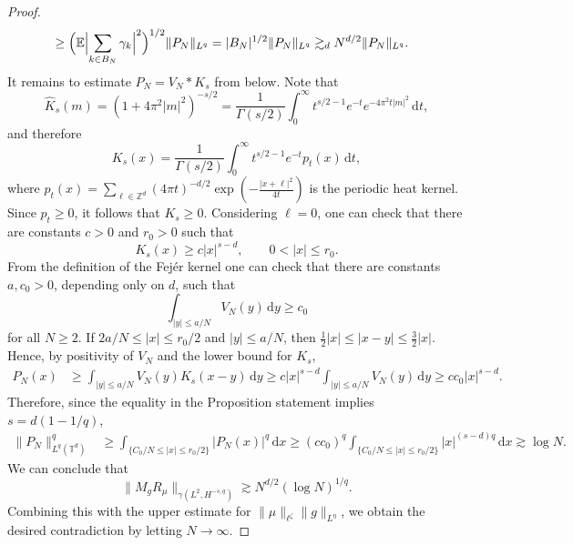 \documentclass[reqno]{amsart}
\theoremstyle{plain}
\theoremstyle{remark}
\theoremstyle{plain}
\numberwithin{equation}{section}
\newcommand{\di}{\mathrm{d}}
\newcommand{\1}{\one}
\begin{document}
\begin{proof}
\[\begin{aligned}
        &\geq
        \Bigl(\mathbb E\Bigl|\sum_{k\in B_N}\gamma_k\Bigr|^2\Bigr)^{1/2}
        \|P_N\|_{L^q}                                                       
        =
        |B_N|^{1/2}\|P_N\|_{L^q}
        \gtrsim_d
        N^{d/2}\|P_N\|_{L^q}.
\end{aligned}
\]
It remains to estimate $P_N=V_N*K_s$ from below. %
Note that
\[
        \widehat K_s(m) = (1+4\pi^2|m|^2)^{-s/2}
        =
        \frac1{\Gamma(s/2)}
        \int_0^\infty t^{s/2-1}e^{-t}e^{-4\pi^2t|m|^2}\,\di t,
\]
and therefore
\[
        K_s(x)
        =
        \frac1{\Gamma(s/2)}
        \int_0^\infty t^{s/2-1}e^{-t}p_t(x)\,\di t,
\]
where $p_t(x) = \sum_{\ell\in\mathbb Z^d}
        (4\pi t)^{-d/2}
        \exp\left(-\frac{|x+\ell|^2}{4t}\right)$ is the periodic heat kernel. 
        Since $p_t\geq0$, it follows that
$K_s\geq0$. Considering $\ell=0$, one can check that there are
constants $c>0$ and $r_0>0$ such that
\[
        K_s(x)\geq c|x|^{s-d},
        \qquad 0<|x|\leq r_0.
\]
From the definition of the Fej\'er kernel one can check that there are
constants $a,c_0>0$, depending only on $d$, such that
\[
        \int_{|y|\leq a/N}V_N(y)\,\di y\geq c_0
\]
for all $N\geq2$. If $2a/N\leq |x|\leq r_0/2$ and $|y|\leq a/N$, then
$\frac12|x|\leq |x-y|\leq \frac32|x|$. Hence, by positivity of $V_N$ and
the lower bound for $K_s$,
\[
\begin{aligned}
        P_N(x)
        &\geq
        \int_{|y|\leq a/N}V_N(y)K_s(x-y)\,\di y                                  
        \geq c|x|^{s-d}\int_{|y|\leq a/N}V_N(y)\,\di y
        \geq 
        cc_0 |x|^{s-d}.
\end{aligned}
\]
Therefore, since the equality in the Proposition statement implies $s=d(1-1/q)$,
\[
\begin{aligned}
        \|P_N\|_{L^q(\mathbb T^d)}^q
        &\geq
        \int_{\{C_0/N\leq |x|\leq r_0/2\}}|P_N(x)|^q\,\di x 
        \geq (cc_0)^q \int_{\{C_0/N\leq |x|\leq r_0/2\}}|x|^{(s-d)q}\, \di x\gtrsim
        \log N.
\end{aligned}
\]
We can conclude that
\[
        \|M_{g}R_{\mu}\|_{\gamma(L^2,H^{-s,q})}
        \gtrsim
        N^{d/2}(\log N)^{1/q}.
\]
Combining this with the upper estimate for
$\|\mu\|_{\ell^\zeta}\|g\|_{L^\eta}$, we obtain the desired contradiction by letting $N\to \infty$. 
\end{proof}
\end{document}
